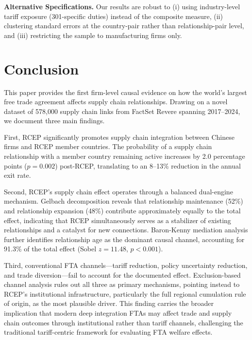 \documentclass[preprint,12pt,authoryear]{elsarticle}
\begin{document}


\textbf{Alternative Specifications.} Our results are robust to (i) using industry-level tariff exposure (301-specific duties) instead of the composite measure, (ii) clustering standard errors at the country-pair rather than relationship-pair level, and (iii) restricting the sample to manufacturing firms only.

\section{Conclusion}
\label{sec:conclusion}

This paper provides the first firm-level causal evidence on how the world's largest free trade agreement affects supply chain relationships. Drawing on a novel dataset of 578,000 supply chain links from FactSet Revere spanning 2017--2024, we document three main findings.

First, RCEP significantly promotes supply chain integration between Chinese firms and RCEP member countries. The probability of a supply chain relationship with a member country remaining active increases by 2.0 percentage points ($p = 0.002$) post-RCEP, translating to an 8--13\% reduction in the annual exit rate.

Second, RCEP's supply chain effect operates through a balanced dual-engine mechanism. Gelbach decomposition reveals that relationship maintenance (52\%) and relationship expansion (48\%) contribute approximately equally to the total effect, indicating that RCEP simultaneously serves as a stabilizer of existing relationships and a catalyst for new connections. Baron-Kenny mediation analysis further identifies relationship age as the dominant causal channel, accounting for 91.3\% of the total effect (Sobel $z = 11.48$, $p < 0.001$).

Third, conventional FTA channels---tariff reduction, policy uncertainty reduction, and trade diversion---fail to account for the documented effect. Exclusion-based channel analysis rules out all three as primary mechanisms, pointing instead to RCEP's institutional infrastructure, particularly the full regional cumulation rule of origin, as the most plausible driver. This finding carries the broader implication that modern deep integration FTAs may affect trade and supply chain outcomes through institutional rather than tariff channels, challenging the traditional tariff-centric framework for evaluating FTA welfare effects.
\end{document}
